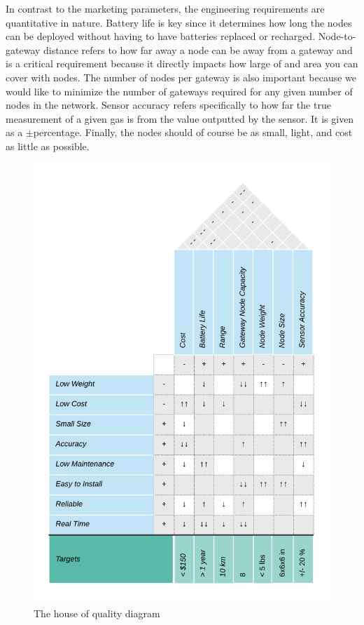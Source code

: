In contrast to the marketing parameters, the engineering requirements are
quantitative in nature. Battery life is key since it determines how long the
nodes can be deployed without having to have batteries replaced or recharged.
Node-to-gateway distance refers to how far away a node can be away from a
gateway and is a critical requirement because it directly impacts how large of
and area you can cover with nodes. The number of nodes per gateway is also
important because we would like to minimize the number of gateways required for
any given number of nodes in the network. Sensor accuracy refers specifically to
how far the true measurement of a given gas is from the value outputted by the
sensor. It is given as a $\pm$percentage. Finally, the nodes should of course be
as small, light, and cost as little as possible.

\begin{figure}[H]
    \centering
    \includegraphics[width=5in]{./figures/hoq.png} 
    \caption{The house of quality diagram}
    \label{fig:hoq}
\end{figure}

